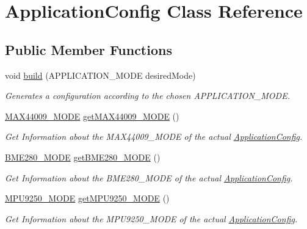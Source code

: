\hypertarget{class_application_config}{}\section{Application\+Config Class Reference}
\label{class_application_config}
\subsection*{Public Member Functions}
\begin{DoxyCompactItemize}
\item 
void \hyperlink{class_application_config_a0b25f55661cd3218c2fa1f8b7560c9a5}{build} (A\+P\+P\+L\+I\+C\+A\+T\+I\+O\+N\+\_\+\+M\+O\+D\+E desired\+Mode)
\begin{DoxyCompactList}\small\item\em Generates a configuration according to the chosen A\+P\+P\+L\+I\+C\+A\+T\+I\+O\+N\+\_\+\+M\+O\+D\+E. \end{DoxyCompactList}\item 
\hyperlink{_m_a_x44009_config_8h_a2c5c90cfcbd78cedaaf2c20e01b00b56}{M\+A\+X44009\+\_\+\+M\+O\+D\+E} \hyperlink{class_application_config_ad00f76ad2fa2114d13bccbdec2c598bb}{get\+M\+A\+X44009\+\_\+\+M\+O\+D\+E} ()
\begin{DoxyCompactList}\small\item\em Get Information about the M\+A\+X44009\+\_\+\+M\+O\+D\+E of the actual \hyperlink{class_application_config}{Application\+Config}. \end{DoxyCompactList}\item 
\hyperlink{_b_m_e280_config_8h_adbe608ebe4835999264df777979ca834}{B\+M\+E280\+\_\+\+M\+O\+D\+E} \hyperlink{class_application_config_a5813bb5a4efbca27172cf6662e86ae24}{get\+B\+M\+E280\+\_\+\+M\+O\+D\+E} ()
\begin{DoxyCompactList}\small\item\em Get Information about the B\+M\+E280\+\_\+\+M\+O\+D\+E of the actual \hyperlink{class_application_config}{Application\+Config}. \end{DoxyCompactList}\item 
\hyperlink{_m_p_u9250_config_8h_a5e7bb14760657986206f4a28ef647252}{M\+P\+U9250\+\_\+\+M\+O\+D\+E} \hyperlink{class_application_config_a66931263c4ee5cbf05b4e00725af88ae}{get\+M\+P\+U9250\+\_\+\+M\+O\+D\+E} ()
\begin{DoxyCompactList}\small\item\em Get Information about the M\+P\+U9250\+\_\+\+M\+O\+D\+E of the actual \hyperlink{class_application_config}{Application\+Config}. \end{DoxyCompactList}\item 

\end{DoxyCompactItemize}
